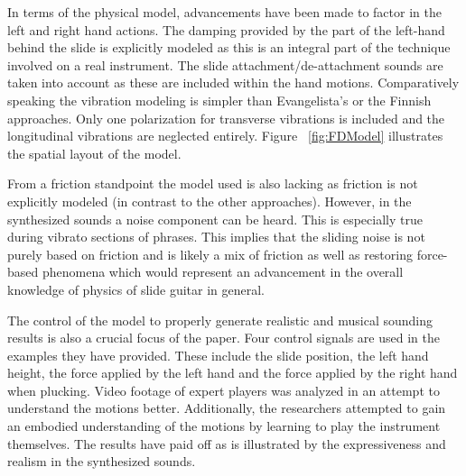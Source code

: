 \documentclass[main.tex]{subfiles}
\begin{document}
In terms of the physical model, advancements have been made to factor in the left and right hand actions. The damping provided by the part of the left-hand behind the slide is explicitly modeled as this is an integral part of the technique involved on a real instrument. The slide attachment/de-attachment sounds are taken into account as these are included within the hand motions. Comparatively speaking the vibration modeling is simpler than Evangelista's or the Finnish approaches. Only one polarization for transverse vibrations is included and the longitudinal vibrations are neglected entirely. Figure~ \ref{fig:FDModel} illustrates the spatial layout of the model.

From a friction standpoint the model used is also lacking as friction is not explicitly modeled (in contrast to the other approaches). However, in the synthesized sounds a noise component can be heard. This is especially true during vibrato sections of phrases. This implies that the sliding noise is not purely based on friction and is likely a mix of friction as well as restoring force-based phenomena which would represent an advancement in the overall knowledge of physics of slide guitar in general.

The control of the model to properly generate realistic and musical sounding results is also a crucial focus of the paper. Four control signals are used in the examples they have provided. These include the slide position, the left hand height, the force applied by the left hand and the force applied by the right hand when plucking. Video footage of expert players was analyzed in an attempt to understand the motions better. Additionally, the researchers attempted to gain an embodied understanding of the motions by learning to play the instrument themselves. The results have paid off as is illustrated by the expressiveness and realism in the synthesized sounds.
\end{document}
